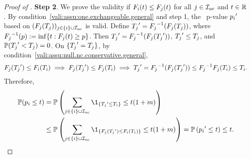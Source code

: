 \begin{proof}[Proof of ]
\textbf{Step 2}. We prove the validity if ${F_{i}}(t) \le {F_{j}}(t)$ for all $j \in {\mathcal{I}_{\text{nc}}}$ and $t \in \mathbb{R}$.
By condition~\ref{vali:assu:one.exchangeable.general} and step 1, the \nickname~p-value ${p_{i}}'$ based on $({F_{j}}({T_{j}}))_{j \in \{i\} \cup {\mathcal{I}_{\text{nc}}}}$ is valid.
Define ${T_{j}}' = {F_{j}}^{-1}({F_{j}}({T_{j}}))$,
where ${F_{j}}^{-1}(p) := \inf\{t: {F_{j}}(t) \ge p\}$.
Then ${T_{j}}' = {F_{j}}^{-1}({F_{j}}({T_{j}}'))$, ${T_{j}}' \le {T_{j}}$, and $\mathbb{P}({T_{j}}' < {T_{j}}) = 0$.
On $\{{T_{j}}' = {T_{j}}\}$, by condition~\ref{vali:assu:null.nc.conservative.general},
\begin{align*}
    {F_{j}}({T_{j}}') \le {F_{i}}({T_{i}})
    \implies
    {F_{j}}({T_{j}}') \le {F_{j}}({T_{i}})
    \implies
    {T_{j}}'
    = {F_{j}}^{-1}({F_{j}}({T_{j}}')) \le {F_{j}}^{-1}{F_{j}}({T_{i}})
    \le {T_{i}}.
\end{align*}
Therefore,
\begin{align*}
    \PP(\pval{i} \le t)
    &= \PP\left(\sum_{j \in \{i\} \cup \hypothesisIndex{\text{nc}}} \1_{\{\testStatistics{j}' \le \testStatistics{i}\}}
    \le t(1+\NoNc)\right)
    \\
    &\le \PP\left(\sum_{j \in \{i\} \cup\hypothesisIndex{\text{nc}}} \1_{\{\cdfTestStatistics{j}(\testStatistics{j}') \le \cdfTestStatistics{i}(\testStatistics{i})\}}
    \le t(1+\NoNc)\right)
    =  \PP\left(\pval{i}' \le t\right)
    \le t.
\end{align*}

\end{proof}
